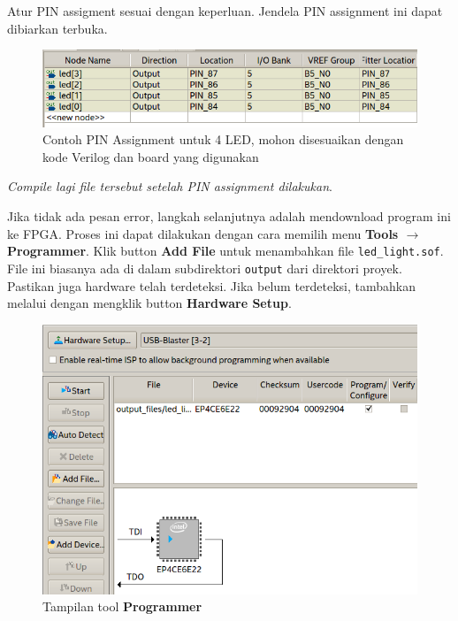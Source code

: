 Atur PIN assigment sesuai dengan keperluan.
Jendela PIN assignment ini dapat dibiarkan terbuka.

\begin{figure}[H]
\centering
\includegraphics[scale=0.5]{images/PinPlanner_4LED.png}
\par
\caption{Contoh PIN Assignment untuk 4 LED, mohon disesuaikan dengan
kode Verilog dan board yang digunakan}
\end{figure}

\textit{Compile lagi file tersebut setelah PIN assignment dilakukan}.

Jika tidak ada pesan error, langkah selanjutnya adalah mendownload program
ini ke FPGA. Proses ini dapat dilakukan dengan cara memilih menu
\textbf{Tools $\rightarrow$ Programmer}.
Klik button \textbf{Add File} untuk menambahkan file {\tt led\_light.sof}.
File ini biasanya ada di dalam subdirektori {\tt output} dari direktori
proyek.
Pastikan juga hardware telah terdeteksi. Jika belum terdeteksi, tambahkan melalui
dengan mengklik button \textbf{Hardware Setup}.

\begin{figure}[H]
\centering
\includegraphics[scale=0.4]{images/Programmer_4LED.png}
\par
\caption{Tampilan tool \textbf{Programmer}}
\end{figure}

